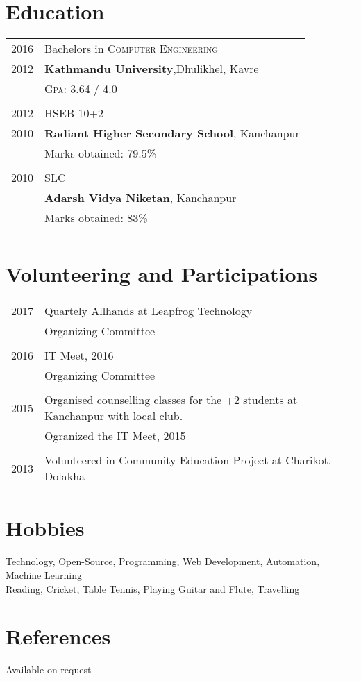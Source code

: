 \documentclass[a4paper,10pt]{article}
\begin{document}
\section{Education}
\begin{tabular}{rl}	
2016  & Bachelors in \textsc{Computer Engineering}\\
2012 & \textbf{Kathmandu University},Dhulikhel, Kavre\\
& \normalsize \textsc{Gpa}: 3.64 / 4.0\\\\
2012 & HSEB 10+2 \\ 
2010 &\normalsize\textbf{Radiant Higher Secondary School}, Kanchanpur\\
&Marks obtained: 79.5\%\\&\\
2010& SLC\\ & \textbf{Adarsh Vidya Niketan}, Kanchanpur\\
&Marks obtained: 83\%\\&\\
\end{tabular}

\section{Volunteering and Participations}
\begin{tabular}{rl}	
\textsc{2017}  & Quartely Allhands at Leapfrog Technology\\
 				& Organizing Committee\\\\
 \textsc{2016}  & IT Meet, 2016\\
 				& Organizing Committee\\\\
 \textsc{2015} & Organised counselling classes for the +2 students at Kanchanpur with local club.\\
 &Ogranized the IT Meet, 2015\\\\
 \textsc{2013} & Volunteered in Community Education Project at Charikot, Dolakha
\end{tabular}


\section{Hobbies}
Technology, Open-Source, Programming, Web Development, Automation, Machine Learning\\
Reading, Cricket, Table Tennis, Playing Guitar and Flute, Travelling\\

\section{References}
Available on request
\end{document}
